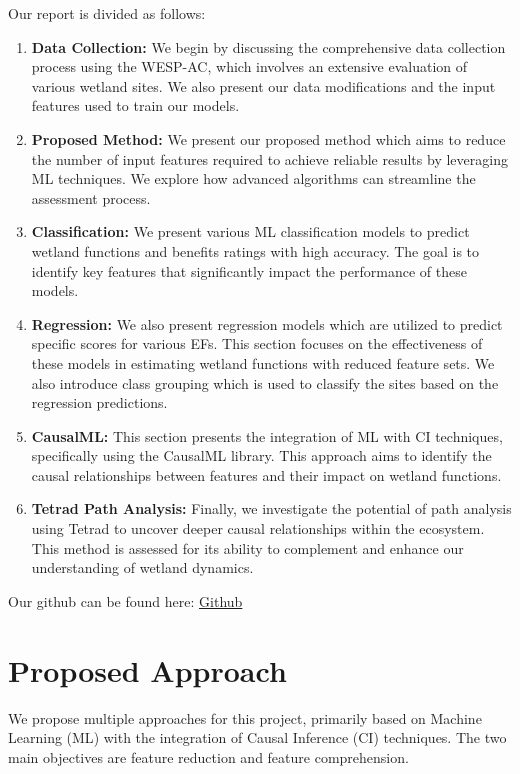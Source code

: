 \documentclass[12pt,letterpaper]{article}
\begin{document}
Our report is divided as follows:
\begin{enumerate}
    \item \textbf{Data Collection:} 
    We begin by discussing the comprehensive data collection process using the \ac{WESP-AC}, which involves an extensive evaluation of various wetland sites.
    We also present our data modifications and the input features used to train our models.
    
    \item \textbf{Proposed Method:} 
    We present our proposed method which aims to reduce the number of input features required to achieve reliable results by leveraging \ac{ML} techniques. We explore how advanced algorithms can streamline the assessment process.

    \item \textbf{Classification:} 
    We present various \ac{ML} classification models to predict wetland functions and benefits ratings with high accuracy.
    The goal is to identify key features that significantly impact the performance of these models.

    \item \textbf{Regression:} 
    We also present regression models which are utilized to predict specific scores for various \acp{EF}.
    This section focuses on the effectiveness of these models in estimating wetland functions with reduced feature sets.
    We also introduce class grouping which is used to classify the sites based on the regression predictions.

    \item \textbf{CausalML:} 
    This section presents the integration of \ac{ML} with \ac{CI} techniques, specifically using the CausalML library.
    This approach aims to identify the causal relationships between features and their impact on wetland functions.

    \item \textbf{Tetrad Path Analysis:} 
    Finally, we investigate the potential of path analysis using Tetrad to uncover deeper causal relationships within the ecosystem. This method is assessed for its ability to complement and enhance our understanding of wetland dynamics.
\end{enumerate}


Our github can be found here: \href{https://github.com/majrblais/MillieuHumidePublic}{Github}

\section{Proposed Approach}\label{sec:PA}
We propose multiple approaches for this project, primarily based on Machine Learning (\ac{ML}) with the integration of Causal Inference (\ac{CI}) techniques.
The two main objectives are feature reduction and feature comprehension.
\end{document}
